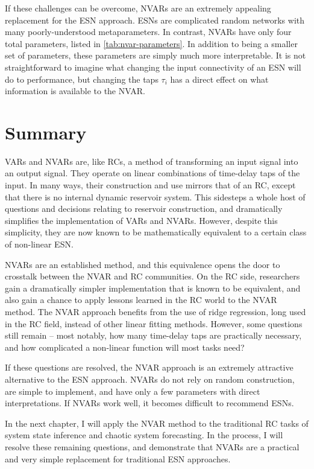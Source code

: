 If these challenges can be overcome, NVARs are an extremely appealing
replacement for the ESN approach. ESNs are complicated random networks
with many poorly-understood metaparameters. In contrast, NVARs have
only four total parameters, listed in \cref{tab:nvar-parameters}.  In
addition to being a smaller set of parameters, these parameters are
simply much more interpretable. It is not straightforward to imagine
what changing the input connectivity of an ESN will do to performance,
but changing the taps $\tau_i$ has a direct effect on what information
is available to the NVAR.

\section{Summary}

VARs and NVARs are, like RCs, a method of transforming an input signal
into an output signal. They operate on linear combinations of
time-delay taps of the input. In many ways, their construction and use
mirrors that of an RC, except that there is no internal dynamic
reservoir system. This sidesteps a whole host of questions and
decisions relating to reservoir construction, and dramatically
simplifies the implementation of VARs and NVARs. However, despite this
simplicity, they are now known to be mathematically equivalent to a
certain class of non-linear ESN.

NVARs are an established method, and this equivalence opens the door
to crosstalk between the NVAR and RC communities. On the RC side,
researchers gain a dramatically simpler implementation that is known
to be equivalent, and also gain a chance to apply lessons learned in
the RC world to the NVAR method. The NVAR approach benefits from the
use of ridge regression, long used in the RC field, instead of other
linear fitting methods. However, some questions still remain -- most
notably, how many time-delay taps are practically necessary, and how
complicated a non-linear function will most tasks need?

If these questions are resolved, the NVAR approach is an extremely
attractive alternative to the ESN approach. NVARs do not rely on
random construction, are simple to implement, and have only a few
parameters with direct interpretations. If NVARs work well, it becomes
difficult to recommend ESNs.

In the next chapter, I will apply the NVAR method to the traditional
RC tasks of system state inference and chaotic system forecasting. In
the process, I will resolve these remaining questions, and demonstrate
that NVARs are a practical and very simple replacement for traditional
ESN approaches.

